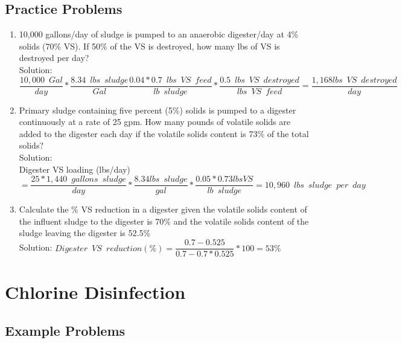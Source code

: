 \documentclass{article}
\begin{document}
\subsection{Practice Problems} 

\begin{enumerate}

\item 10,000 gallons/day of sludge is pumped to an anaerobic digester/day at 4\% solids (70\% VS).  If 50\% of the VS is destroyed, how many lbs of VS is destroyed per day?\\
Solution:\\
$\dfrac{10,000 \enspace Gal}{day}*\dfrac{8.34 \enspace lbs \enspace sludge}{Gal} \dfrac{0.04*0.7 \enspace lbs \enspace VS \enspace feed}{lb \enspace sludge}*\dfrac{0.5 \enspace lbs \enspace VS \enspace destroyed}{lbs \enspace VS \enspace feed}=\boxed{\dfrac{1,168lbs \enspace VS \enspace destroyed}{day} } $


\item Primary sludge containing five percent (5\%) solids is pumped to a digester continuously at a rate of 25 gpm. How many pounds of volatile solids are added to the digester each day if the volatile solids content is 73\% of the total solids?\\
Solution:\\
Digester VS loading (lbs/day)\\$=\dfrac{25*1,440 \enspace gallons \enspace sludge}{day}*\dfrac{8.34lbs \enspace sludge}{gal}*\dfrac{0.05*0.73lbs VS}{lb \enspace sludge}=\boxed{10,960 \enspace lbs \enspace sludge \enspace per \enspace day}$\\


\item Calculate the \% VS reduction in a digester given the volatile solids content of the influent sludge to the digester is 70\% and the volatile solids content of the sludge leaving the digester is 52.5\%\\
Solution:  $Digester \enspace VS \enspace reduction (\%)=\dfrac{0.7-0.525}{0.7-0.7*0.525}*100=\boxed{ 53\%}$\\

\end{enumerate}

\section{Chlorine Disinfection}

\subsection{Example Problems} 
\end{document}

